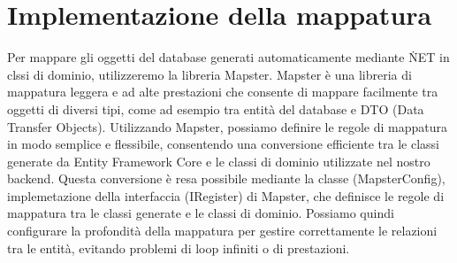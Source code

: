 \documentclass[12pt, a4paper]{article}
\begin{document}
\section{Implementazione della mappatura}
Per mappare gli oggetti del database generati automaticamente mediante \.NET in clssi di dominio, utilizzeremo la libreria Mapster.
Mapster è una libreria di mappatura leggera e ad alte prestazioni che consente di mappare facilmente tra oggetti di diversi tipi,
come ad esempio tra entità del database e DTO (Data Transfer Objects).
Utilizzando Mapster, possiamo definire le regole di mappatura in modo semplice e flessibile,
consentendo una conversione efficiente tra le classi generate da Entity Framework Core e le classi di dominio utilizzate nel nostro backend.
Questa conversione è resa possibile mediante la classe \text(MapsterConfig), implemetazione della interfaccia \text(IRegister) di Mapster,
che definisce le regole di mappatura tra le classi generate e le classi di dominio.
Possiamo quindi configurare la profondità della mappatura per gestire correttamente le relazioni tra le entità, evitando problemi di loop infiniti o di prestazioni.
\end{document}
